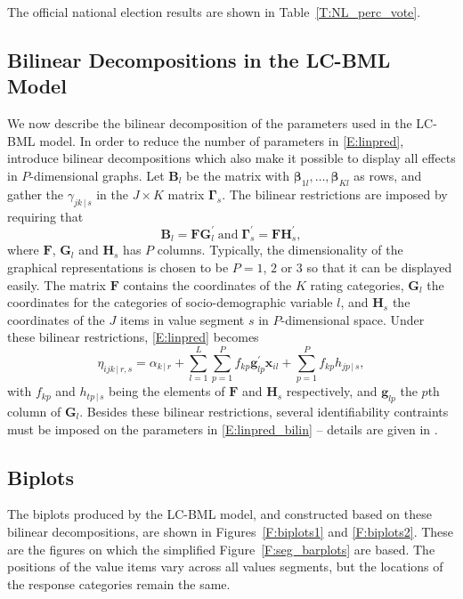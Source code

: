 \documentclass[12pt,letter]{article}\usepackage[]{graphicx}\usepackage[]{xcolor}
\newcommand{\mat}[1]{\mathbf{#1}}   %
\newcommand{\vect}[1]{\boldsymbol{#1}}  %
\begin{document}
The official national election results are shown in Table~\ref{T:NL_perc_vote}. 

\subsection*{Bilinear Decompositions in the LC-BML Model}

We now describe the bilinear decomposition of the parameters used in the LC-BML model. In order to reduce the number of parameters in \eqref{E:linpred}, \citet{vanrosmalen2010} introduce bilinear decompositions which also make it possible to display all effects in $P$-dimensional graphs. Let $\mat{B}_{l}$ be the matrix with $\vect{\beta}_{1l}, \ldots, \vect{\beta}_{Kl}$ as rows, and gather the $\gamma_{jk \, | \, s}$ in the $J \times K$ matrix $\mat{\Gamma}_{s}$. The bilinear restrictions are imposed by requiring that
\begin{equation}
  \mat{B}_{l} = \mat{F} \mat{G}_{l}^{'} \; \text{and} \; \mat{\Gamma}_{s}^{'} = \mat{F} \mat{H}_{s}^{'},
\end{equation}
where $\mat{F}$, $\mat{G}_{l}$ and $\mat{H}_{s}$ has $P$ columns. Typically, the dimensionality of the graphical representations is chosen to be $P = 1$, $2$ or $3$ so that it can be displayed easily. The matrix $\mat{F}$ contains the coordinates of the $K$ rating categories, $\mat{G}_{l}$ the coordinates for the categories of socio-demographic variable $l$, and $\mat{H}_{s}$ the coordinates of the $J$ items in value segment $s$ in $P$-dimensional space. Under these bilinear restrictions, \eqref{E:linpred} becomes
\begin{equation}
  \eta_{ijk \, | \, r, s} = 
      \alpha_{k \, | \, r} + 
      \sum_{l=1}^{L} \sum_{p=1}^{P} f_{kp} \vect{g}_{lp}^{'} \vect{x}_{il} + 
      \sum_{p=1}^{P} f_{kp} h_{jp \, | \, s},
      \label{E:linpred_bilin}
\end{equation}
with $f_{kp}$ and $h_{tp \, | \, s}$ being the elements of $\mat{F}$ and $\mat{H}_{s}$ respectively, and $\vect{g}_{lp}$ the $p$th column of $\mat{G}_{l}$. Besides these bilinear restrictions, several identifiability contraints must be imposed on the parameters in \eqref{E:linpred_bilin} -- details are given in \citet{vanrosmalen2010}.

\subsection*{Biplots}

The biplots produced by the LC-BML model, and constructed based on these bilinear decompositions, are shown in Figures~\ref{F:biplots1} and \ref{F:biplots2}. These are the figures on which the simplified Figure~\ref{F:seg_barplots} are based. The positions of the value items vary across all values segments, but the locations of the response categories remain the same. 
\end{document}

